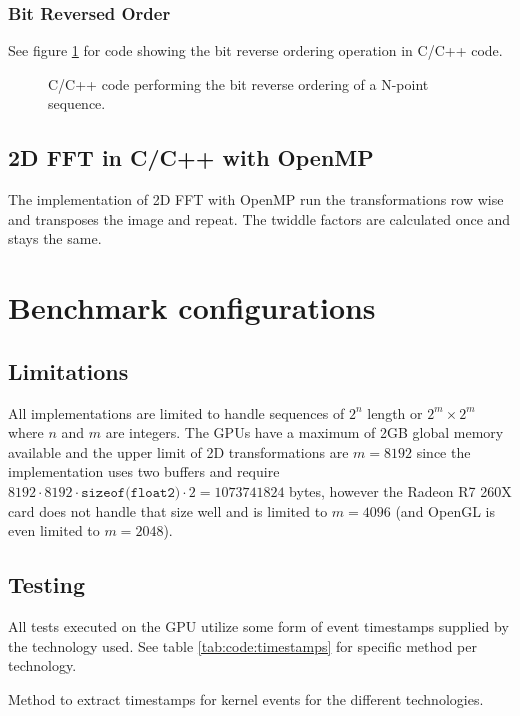 \subsubsection{Bit Reversed Order}

See figure \ref{fig:omp:bit-reverse-order} for code showing the bit reverse ordering operation in C/C++ code.

\begin{figure}[h!]
	\centering
	\begin{framed}
			
	\end{framed}
	\caption{ C/C++ code performing the bit reverse ordering of a N-point sequence. }
	\label{fig:omp:bit-reverse-order}
\end{figure}

\subsection{2D FFT in C/C++ with OpenMP}

The implementation of 2D FFT with OpenMP run the transformations row wise and transposes the image and repeat. The twiddle factors are calculated once and stays the same.

\section{Benchmark configurations}

\subsection{Limitations}

All implementations are limited to handle sequences of $2^n$ length or $2^m \times 2^m$ where $n$ and $m$ are integers. The GPUs have a maximum of 2GB global memory available and the upper limit of 2D transformations are $m = 8192$ since the implementation uses two buffers and require $8192 \cdot 8192 \cdot \texttt{sizeof(float2)} \cdot 2 = 1073741824$ bytes, however the Radeon R7 260X card does not handle that size well and is limited to $m = 4096$ (and OpenGL is even limited to $m = 2048$).

\subsection{Testing}

All tests executed on the GPU utilize some form of event timestamps supplied by the technology used. See table \ref{tab:code:timestamps} for specific method per technology.

\begin{table}[h!]
	\centering
	
	\caption{Method to extract timestamps for kernel events for the different technologies.}
	\label{tab:code:timestamps}
\end{table}

